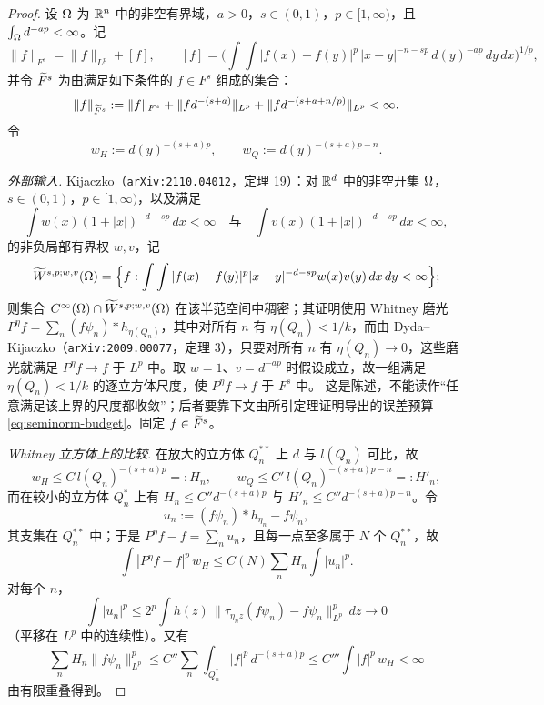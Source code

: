\begin{proof}
设 $\Omega$ 为 $\mathbb{R}^n$ 中的非空有界域，$a>0$，$s\in(0,1)$，$p\in[1,\infty)$，且 $\int_\Omega d^{-ap}<\infty$。记
\[
  \|f\|_{F^s}=\|f\|_{L^p}+[f],\qquad
  [f]=\Big(\int\int |f(x)-f(y)|^p\,|x-y|^{-n-sp}\,d(y)^{-ap}\,dy\,dx\Big)^{1/p},
\]
并令 $\widetilde F^s$ 为由满足如下条件的 $f\in F^s$ 组成的集合：
\[
  \|f\|_{\widetilde F^s}:=\|f\|_{F^s}+\|f d^{-(s+a)}\|_{L^p}+\|f d^{-(s+a+n/p)}\|_{L^p}<\infty .
\]
令
\[
  w_H:=d(y)^{-(s+a)p},\qquad w_Q:=d(y)^{-(s+a)p-n}.
\]

\emph{外部输入.} Kijaczko（\texttt{arXiv:2110.04012}，定理 19）：对 $\mathbb{R}^d$ 中的非空开集 $\Omega$，$s\in(0,1)$，$p\in[1,\infty)$，以及满足
\[
  \int w(x)(1+|x|)^{-d-sp}\,dx<\infty
  \quad\text{与}\quad
  \int v(x)(1+|x|)^{-d-sp}\,dx<\infty ,
\]
的非负局部有界权 $w,v$，记
\[
  \widetilde W^{s,p;w,v}(\Omega)
  =\Big\{f : \int\int |f(x)-f(y)|^p|x-y|^{-d-sp}w(x)v(y)\,dx\,dy<\infty\Big\};
\]
则集合 $C^\infty(\Omega)\cap\widetilde W^{s,p;w,v}(\Omega)$ 在该半范空间中稠密；其证明使用 Whitney 磨光 $P^\eta f=\sum_n(f\psi_n)*h_{\eta(Q_n)}$，其中对所有 $n$ 有 $\eta(Q_n)<1/k$，而由 Dyda--Kijaczko（\texttt{arXiv:2009.00077}，定理 3），只要对所有 $n$ 有 $\eta(Q_n)\to0$，这些磨光就满足 $P^\eta f\to f$ 于 $L^p$ 中。取 $w=1$、$v=d^{-ap}$ 时假设成立，故一组满足 $\eta(Q_n)<1/k$ 的逐立方体尺度，使 $P^{\eta}f\to f$ 于 $F^s$ 中。
这是陈述，不能读作“任意满足该上界的尺度都收敛”；后者要靠下文由所引定理证明导出的误差预算 \eqref{eq:seminorm-budget}。固定 $f\in\widetilde F^s$。

\emph{Whitney 立方体上的比较}. 在放大的立方体 $Q_n^{**}$ 上 $d$ 与 $l(Q_n)$ 可比，故
\[
  w_H\le C\,l(Q_n)^{-(s+a)p}=:H_n ,
  \qquad
  w_Q\le C'\,l(Q_n)^{-(s+a)p-n}=:H'_n ,
\]
而在较小的立方体 $Q_n^*$ 上有 $H_n\le C''d^{-(s+a)p}$ 与 $H'_n\le C''d^{-(s+a)p-n}$。令
\[
  u_n:=(f\psi_n)*h_{\eta_n}-f\psi_n ,
\]
其支集在 $Q_n^{**}$ 中；于是 $P^\eta f-f=\sum_n u_n$，且每一点至多属于 $N$ 个 $Q_n^{**}$，故
\begin{equation}
  \int|P^\eta f-f|^p\,w_H\le C(N)\sum_n H_n\int|u_n|^p .
  \tag{3.8}
\end{equation}
对每个 $n$，
\begin{equation}
  \int|u_n|^p\le 2^p\int h(z)\,\|\tau_{\eta_n z}(f\psi_n)-f\psi_n\|^p_{L^p}\,dz\longrightarrow0
  \tag{3.9}
\end{equation}
（平移在 $L^p$ 中的连续性）。又有
\begin{equation}
  \sum_n H_n\|f\psi_n\|^p_{L^p}
  \le C''\sum_n\int_{Q_n^*}|f|^p\,d^{-(s+a)p}
  \le C'''\int|f|^p\,w_H<\infty
  \tag{3.10}
\end{equation}
由有限重叠得到。


\end{proof}
